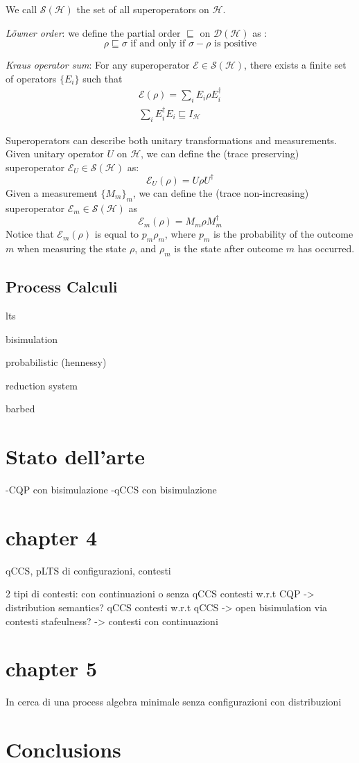 \documentclass[10pt,a4paper, titlepage]{report}
\theoremstyle{definition}
\newcommand{\note}[1]{{\color{red} #1}}
\newcommand{\calH}{\mathcal{H}}
\newcommand{\calDH}{\mathcal{D}(\mathcal{H})}
\newcommand{\calSH}{\mathcal{S}(\mathcal{H})}
\newcommand{\sop}{\mathcal{E}}
\begin{document}
We call $\calSH$ the set of all superoperators on $\calH$.


\textit{Löwner order}: we define the partial order $\sqsubseteq$ on $\calDH$ as :
\[ \rho \sqsubseteq \sigma \text{ if and only if } \sigma-\rho \text{ is positive}\]

\textit{Kraus operator sum}: For any superoperator $\sop \in \calSH$, there exists a finite set of operators $\{E_i\}$ such that
\begin{gather*}
\sop(\rho) = \sum_i E_i\rho E_i^\dagger \\
\sum_i E_i^\dagger E_i \sqsubseteq I_\calH
\end{gather*}

Superoperators can describe both unitary transformations and measurements. Given unitary operator $U$ on $\calH$, we can define  the (trace preserving) superoperator $\sop_U \in \calSH$ as:
\[ \sop_U(\rho) = U \rho U^\dagger\]
Given a measurement $\{M_m\}_m$, we can define the (trace non-increasing) superoperator $\sop_m \in \calSH$ as 
\[\sop_m(\rho) = M_m\rho M_m^\dagger\]
Notice that $\sop_m(\rho)$ is equal to $p_m\rho_m$, where $p_m$ is the probability of the outcome $m$ when measuring the state $\rho$, and $\rho_m$ is the state after outcome $m$ has occurred. 


\section{Process Calculi}	

\note{lts}

\note{bisimulation}

\note{probabilistic (hennessy)}

\note{reduction system}

\note{barbed}


\chapter{Stato dell'arte}
-CQP con bisimulazione 
-qCCS con bisimulazione  	

\chapter{chapter 4}

qCCS, pLTS di configurazioni, contesti 

2 tipi di contesti: con continuazioni o senza
qCCS contesti w.r.t CQP -> distribution semantics?
qCCS contesti w.r.t qCCS -> 
  open bisimulation via contesti
  stafeulness? -> contesti con continuazioni

\chapter{chapter 5}
In cerca di una process algebra minimale
senza configurazioni	
con distribuzioni

\chapter{Conclusions}
\printbibliography[
heading=bibintoc,
title={Bibliography}
]
\end{document}
